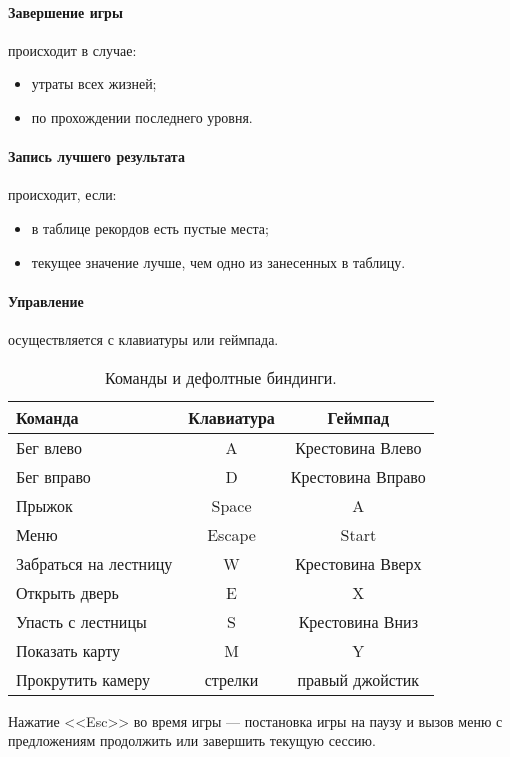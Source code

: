 \documentclass[12pt,a4paper,fullpage,titlepage]{article}
\begin{document}
\paragraph{Завершение игры} происходит в случае:
\begin{itemize}
	\item утраты всех жизней;
	\item по прохождении последнего уровня.
\end{itemize}

\paragraph{Запись лучшего результата} происходит, если:
\begin{itemize}
	\item в таблице рекордов есть пустые места;
	\item текущее значение лучше, чем одно из занесенных в таблицу.
\end{itemize}

\paragraph{Управление} осуществляется с клавиатуры или геймпада.\\
\begin{table}[h]
\begin{tabularx}{\textwidth}{|X|c|c|}
	\hline
	Команда & Клавиатура & Геймпад\\
	\hline
	Бег влево & A & Крестовина Влево \\
	\hline
	Бег вправо & D & Крестовина Вправо \\
	\hline
	Прыжок & Space & A \\
	\hline
	Меню & Escape & Start \\
	\hline
	Забраться на лестницу & W & Крестовина Вверх \\
	\hline
	Открыть дверь & E & X \\
	\hline
	Упасть с лестницы & S & Крестовина Вниз \\
	\hline
	Показать карту & M & Y \\
	\hline
	Прокрутить камеру & стрелки & правый джойстик \\
	\hline
\end{tabularx}
\caption{Команды и дефолтные биндинги.}
\end{table}

Нажатие <<Esc>> во время игры --- постановка игры на паузу и вызов меню с предложениям продолжить или завершить текущую сессию.\\
\end{document}
